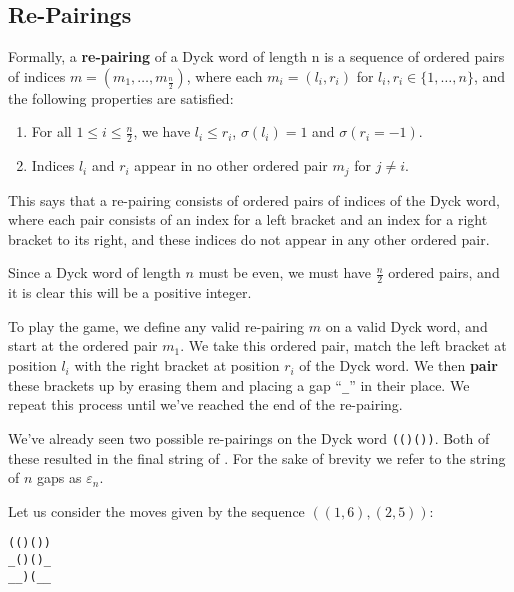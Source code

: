 \subsection{Re-Pairings}
\begin{definition}
    Formally, a \textbf{re-pairing} of a Dyck word of length n is a sequence of ordered pairs of indices $m = (m_{1}, \dots, m_{\frac{n}{2}})$, where each $m_{i} = (l_{i}, r_{i})$ for $l_{i}, r_{i} \in \{1,\dots,n\}$, and the following properties are satisfied:
    \begin{enumerate}
        \item For all $1\leq i\leq \frac{n}{2}$, we have $l_{i} \leq r_{i}$, $\sigma(l_{i}) = 1$ and $\sigma(r_{i} = -1)$. 
        \item Indices $l_{i}$ and $r_{i}$ appear in no other ordered pair $m_{j}$ for $j \neq i$.
    \end{enumerate}
\end{definition}

This says that a re-pairing consists of ordered pairs of indices of the Dyck word, where each pair consists of an index for a left bracket and an index for a right bracket to its right, and these indices do not appear in any other ordered pair.

Since a Dyck word of length $n$ must be even, we must have $\frac{n}{2}$ ordered pairs, and it is clear this will be a positive integer.

To play the game, we define any valid re-pairing $m$ on a valid Dyck word, and start at the ordered pair $m_{1}$. We take this ordered pair, match the left bracket at position $l_{i}$ with the right bracket at position $r_{i}$ of the Dyck word. We then \textbf{pair} these brackets up by erasing them and placing a gap ``\texttt{\string_}'' in their place. We repeat this process until we've reached the end of the re-pairing.

We've already seen two possible re-pairings on the Dyck word \texttt{(()())}. Both of these resulted in the final string of . For the sake of brevity we refer to the string of $n$ gaps as $\varepsilon_{n}$. 

Let us consider the moves given by the sequence $((1,6),(2, 5))$:

\null
\begin{center}
    \texttt{(()())} \\
    \texttt{\string_()()\string_} \\
    \texttt{\string_\string_)(\string_\string_}
\end{center}
\null

